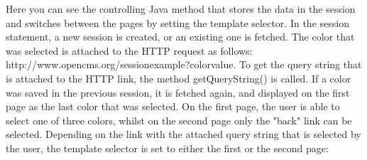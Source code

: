 Here you can see the controlling Java method that stores the data in the
session and switches between the pages by setting the template selector.
In the session statement, a new session is created, or an existing one is
fetched. The color that was selected is attached to the HTTP request as
follows: http://www.opencms.org/sessionexample?colorvalue. To get the
query string that is attached to the HTTP link, the method
{\meth getQueryString()} is called. If a color was saved in the previous session,
it is fetched again, and displayed on the first page as the last color
that was selected. On the first page, the user is able to select one of
three colors, whilst on the second page only the "back" link can be
selected. Depending on the link with the attached query string that is
selected by the user, the template selector is set to either the first
or the second page:

